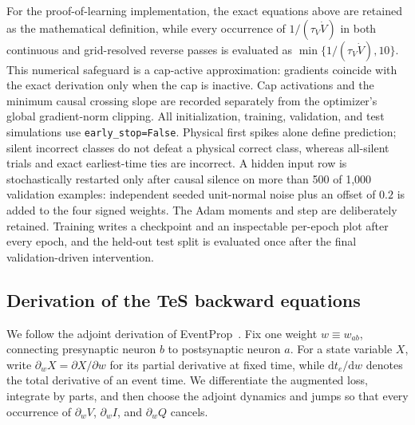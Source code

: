For the proof-of-learning implementation, the exact equations above are retained
as the mathematical definition, while every occurrence of
$1/(\tau_V\dot V)$ in both continuous and grid-resolved reverse passes is
evaluated as $\min\{1/(\tau_V\dot V),10\}$. This numerical safeguard is a
cap-active approximation: gradients coincide with the exact derivation only
when the cap is inactive. Cap activations and the minimum causal crossing slope
are recorded separately from the optimizer's global gradient-norm clipping.
All initialization, training, validation, and test simulations use
\verb|early_stop=False|. Physical first spikes alone define prediction; silent
incorrect classes do not defeat a physical correct class, whereas all-silent
trials and exact earliest-time ties are incorrect. A hidden input row is
stochastically restarted only after causal silence on more than 500 of 1,000
validation examples: independent seeded unit-normal noise plus an offset of
$0.2$ is added to the four signed weights. The Adam moments and step are
deliberately retained. Training writes a checkpoint and an inspectable
per-epoch plot after every epoch, and the held-out test split is evaluated once
after the final validation-driven intervention.

\subsection{Derivation of the TeS backward equations}
\label{sec:eventprop-derivation}

We follow the adjoint derivation of EventProp~\cite{wunderlich2021eventprop}.
Fix one weight $w\equiv w_{ab}$, connecting presynaptic neuron $b$ to
postsynaptic neuron $a$. For a state variable $X$, write
$\partial_wX=\partial X/\partial w$ for its partial derivative at fixed time,
while $\mathrm dt_e/\mathrm dw$ denotes the total derivative of an event time.
We differentiate the augmented loss, integrate by parts, and then choose the
adjoint dynamics and jumps so that every occurrence of $\partial_wV$,
$\partial_wI$, and $\partial_wQ$ cancels.

